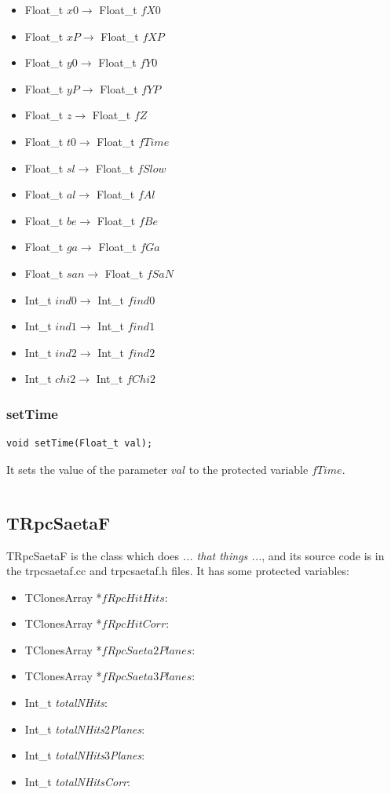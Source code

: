 \documentclass[a4paper]{book}
\begin{document}
\begin{itemize}
	\item Float\_t $x0 \rightarrow$ Float\_t $fX0$
	\item Float\_t $xP \rightarrow$ Float\_t $fXP$
	\item Float\_t $y0 \rightarrow$ Float\_t $fY0$
	\item Float\_t $yP \rightarrow$ Float\_t $fYP$
	\item Float\_t $z \rightarrow$ Float\_t $fZ$
	\item Float\_t $t0 \rightarrow$ Float\_t $fTime$
	\item Float\_t $sl \rightarrow$ Float\_t $fSlow$
	\item Float\_t $al \rightarrow$ Float\_t $fAl$
	\item Float\_t $be \rightarrow$ Float\_t $fBe$
	\item Float\_t $ga \rightarrow$ Float\_t $fGa$
	\item Float\_t $san \rightarrow$ Float\_t $fSaN$
	\item Int\_t $ind0 \rightarrow$ Int\_t $find0$
	\item Int\_t $ind1 \rightarrow$ Int\_t $find1$
	\item Int\_t $ind2 \rightarrow$ Int\_t $find2$
	\item Int\_t $chi2 \rightarrow$ Int\_t $fChi2$
\end{itemize}

\subsubsection{setTime}

\begin{lstlisting}
void setTime(Float_t val);
\end{lstlisting}

It sets the value of the parameter $val$ to the protected variable $fTime$.

\[\]




\subsection{TRpcSaetaF}

TRpcSaetaF is the class which does \textit{... that things ...}, and its source code is in the trpcsaetaf.cc and trpcsaetaf.h files. It has some protected variables:

\begin{itemize}
	\item TClonesArray  *$fRpcHitHits$: 
	\item TClonesArray  *$fRpcHitCorr$: 
	\item TClonesArray  *$fRpcSaeta2Planes$: 
	\item TClonesArray  *$fRpcSaeta3Planes$: 
	\item Int\_t \textit{totalNHits}: 
	\item Int\_t \textit{totalNHits}2\textit{Planes}: 
	\item Int\_t \textit{totalNHits}3\textit{Planes}: 
	\item Int\_t \textit{totalNHitsCorr}: 
\end{itemize}
\end{document}
